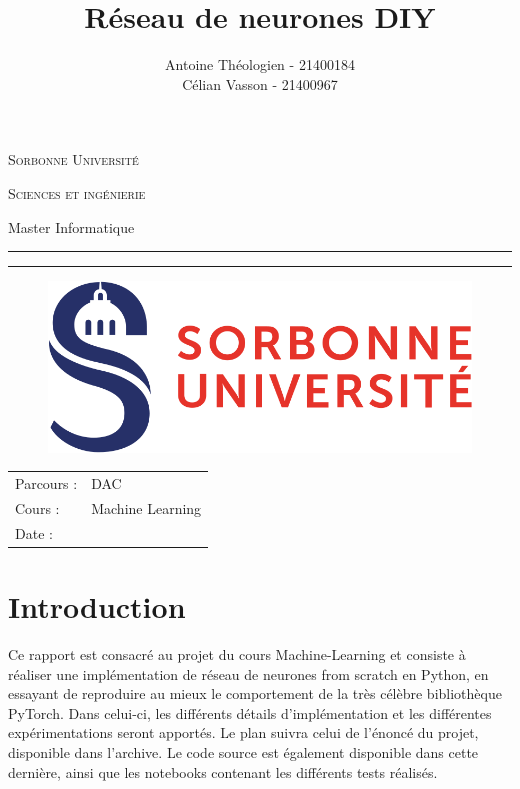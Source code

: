 \documentclass{article}
\title{Réseau de neurones DIY}
\author{Antoine Théologien - 21400184 \\
Célian Vasson - 21400967}
\newcommand{\program}{Master Informatique}
\newcommand{\parcours}{DAC}
\newcommand{\course}{Machine Learning}
\begin{document}
\begin{titlepage}
\makeatletter
\begin{center}
	\textsc{Sorbonne Université}
	\par \textsc{Sciences et ingénierie }
	\par \program

        \vfill
        \hrule height .08em \bigskip
	\par\huge\@title\bigskip
	\par\Large\@author\bigskip
	\hrule height .08em \normalsize

	\vfill
        \begin{figure}[H]
        \centering
        \includegraphics[width=0.8\linewidth]{Images/Logo_of_Sorbonne_University.svg.png}
        \label{fig:enter-label}
        \end{figure}
	\vfill

	\begin{tabular}{ll}
		\toprule
            Parcours : & \parcours\\
		Cours : & \course\\
		Date : & \@date\\
		\bottomrule
	\end{tabular}
	
	\vfill
\end{center}
\makeatother
\end{titlepage}

\section{Introduction}
Ce rapport est consacré au projet du cours Machine-Learning et consiste à réaliser une implémentation de réseau de neurones from scratch en Python, en essayant de reproduire au mieux le comportement de la très célèbre bibliothèque PyTorch. Dans celui-ci, les différents détails d'implémentation et les différentes expérimentations seront apportés. Le plan suivra celui de l'énoncé du projet, disponible dans l'archive. Le code source est également disponible dans cette dernière, ainsi que les notebooks contenant les différents tests réalisés.
\end{document}
